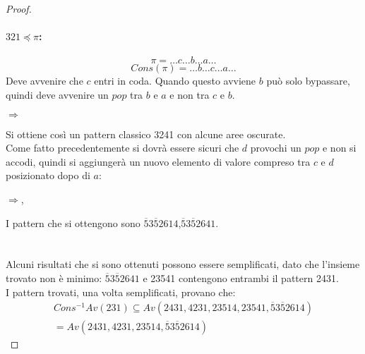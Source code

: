 \documentclass[10pt,a4paper]{article}
\begin{document}
\begin{proof}
\paragraph*{$321\preceq\pi$:}$$\pi=\dots c\dots b\dots a\dots$$$$Cons(\pi)=\dots b\dots c\dots a\dots$$
Deve avvenire che $c$ entri in coda. Quando questo avviene $b$ può solo bypassare, quindi deve avvenire un $pop$ tra $b$ e $a$ e non tra $c$ e $b$.
\begin{center}
$\Rightarrow$
\end{center}
Si ottiene così un pattern classico 3241 con alcune aree oscurate.\\Come fatto precedentemente si dovrà essere sicuri che $d$ provochi un $pop$ e non si accodi, quindi si aggiungerà un nuovo elemento di valore compreso tra $c$ e $d$ posizionato dopo di $a$:
\begin{center}
$\Rightarrow$,
\end{center}
I pattern che si ottengono sono $\overline{5}3\overline{5}2614$,$\overline{5}3\overline{5}2641$.\\\\\\
Alcuni risultati che si sono ottenuti possono essere semplificati, dato che l'insieme trovato non è minimo: $\overline{5}3\overline{5}2641$ e 23541 contengono entrambi il pattern 2431.\\
I pattern trovati, una volta semplificati, provano che:
\begin{eqnarray*}
Cons^{-1}Av(231)\subseteq{Av(2431, 4231, 23514, 23541, \overline{5}3\overline{5}2614)}\\ = Av(2431, 4231, 23514, \overline{5}3\overline{5}2614)
\end{eqnarray*}
\end{proof}
\end{document}
